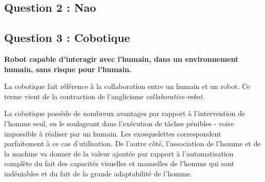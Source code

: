 \subsection{Question 2 : Nao}


\subsection{Question 3 : Cobotique}

\textbf{Robot capable d'interagir avec l'humain, dans un environnement humain, sans
risque pour l'humain.}

La cobotique fait référence à la collaboration entre un humain et un robot.
Ce terme vient de la contraction de l'anglicisme \emph{collaborative-robot}.

La cobotique possède de nombreux avantages par rapport à l'intervention de
l'homme seul, en le soulageant dans l'exécution de tâches pénibles - voire
impossible à réaliser par un humain. Les exosquelettes correspondent
parfaitement à ce cas d'utilisation.
De l'autre côté, l'association de l'homme et de la machine va donner de la
valeur ajoutée par rapport à l'automatisation complète du fait des capacités
visuelles et manuelles de l'homme qui sont indéniables et du fait de la grande
adaptabilité de l'homme.

